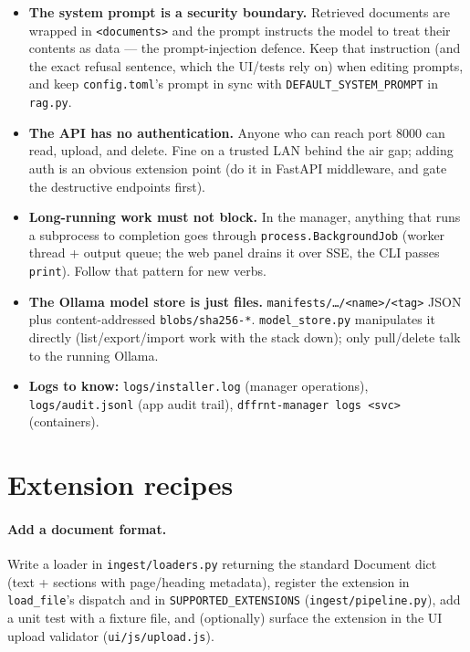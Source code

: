 \documentclass[11pt,letterpaper]{article}
\let\oldsection\section
\renewcommand{\section}{\vspace{1em}\oldsection}
\begin{document}
\begin{itemize}
  \item \textbf{The system prompt is a security boundary.} Retrieved
        documents are wrapped in \texttt{<documents>} and the prompt
        instructs the model to treat their contents as data --- the
        prompt-injection defence. Keep that instruction (and the exact
        refusal sentence, which the UI/tests rely on) when editing prompts,
        and keep \texttt{config.toml}'s prompt in sync with
        \texttt{DEFAULT\_SYSTEM\_PROMPT} in \texttt{rag.py}.
  \item \textbf{The API has no authentication.} Anyone who can reach port
        8000 can read, upload, and delete. Fine on a trusted LAN behind the
        air gap; adding auth is an obvious extension point (do it in
        FastAPI middleware, and gate the destructive endpoints first).
  \item \textbf{Long-running work must not block.} In the manager,
        anything that runs a subprocess to completion goes through
        \texttt{process.BackgroundJob} (worker thread + output queue; the
        web panel drains it over SSE, the CLI passes \texttt{print}).
        Follow that pattern for new verbs.
  \item \textbf{The Ollama model store is just files.}
        \texttt{manifests/\ldots/<name>/<tag>} JSON plus content-addressed
        \texttt{blobs/sha256-*}. \texttt{model\_store.py} manipulates it
        directly (list/export/import work with the stack down); only
        pull/delete talk to the running Ollama.
  \item \textbf{Logs to know:} \texttt{logs/installer.log} (manager
        operations), \texttt{logs/audit.jsonl} (app audit trail),
        \texttt{dffrnt-manager logs <svc>} (containers).
\end{itemize}

\section{Extension recipes}

\paragraph{Add a document format.}
Write a loader in \texttt{ingest/loaders.py} returning the standard
Document dict (text + sections with page/heading metadata), register the
extension in \texttt{load\_file}'s dispatch and in
\texttt{SUPPORTED\_EXTENSIONS} (\texttt{ingest/pipeline.py}), add a unit
test with a fixture file, and (optionally) surface the extension in the UI
upload validator (\texttt{ui/js/upload.js}).
\end{document}
